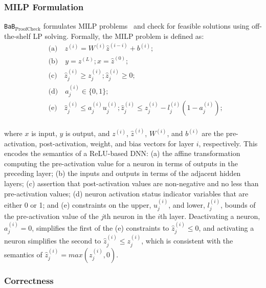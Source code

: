 \documentclass[oneside,11pt,dvipsnames]{book}
\numberwithin{equation}{section}
\theoremstyle{definition}
\theoremstyle{remark}
\newcommand{\proofcheck}{\texttt{BaB$_{\text{ProofCheck}}$}}
\begin{document}
\subsubsection{MILP Formulation}\label{sec:milp}

\proofcheck{} formulates MILP problems~\cite{tjeng2019evaluating} and check for feasible solutions using off-the-shelf LP solving. Formally, the MILP problem is defined as:
\begin{equation}
    \begin{aligned}
        &\mbox{(a)}\quad z^{(i)} = W^{(i)} \hat{z}^{(i-i)} + b^{(i)};\\
        &\mbox{(b)}\quad y = z^{(L)};  x = \hat{z}^{(0)}; \\
        &\mbox{(c)}\quad \hat{z}_j^{(i)} \ge {z}_j^{(i)}; \hat{z}_j^{(i)} \ge 0; \\
        &\mbox{(d)}\quad a_j^{(i)} \in \{ 0, 1\} ;\\
        &\mbox{(e)}\quad \hat{z}_j^{(i)} \le {a}_j^{(i)} {u}_j^{(i)}; \hat{z}_j^{(i)} \le {z}_j^{(i)} - {l}_j^{(i)}(1 - {a}_j^{(i)}); \\
    \end{aligned}
    \label{eq:mip}
\end{equation}

\noindent where $x$ is input, $y$ is output, and $z^{(i)}$, $\hat{z}^{(i)}$, $W^{(i)}$, and $b^{(i)}$ are the pre-activation, post-activation, weight, and bias vectors for layer $i$, respectively. 
This encodes the semantics of a ReLU-based DNN:  
(a) the affine transformation computing the pre-activation value for a neuron in terms of outputs in the preceding layer;
(b) the inputs and outputs in terms of the adjacent hidden layers;
(c) assertion that post-activation values are non-negative and no less than pre-activation values;
(d) neuron activation status indicator variables that are either 0 or 1; and
(e) constraints on the upper, $u_j^{(i)}$, and lower, $l_j^{(i)}$, bounds of the pre-activation value of the $j$th neuron in the $i$th layer.
Deactivating a neuron, $a_j^{(i)} = 0$, simplifies the first of the (e) constraints to $\hat{z}_j^{(i)} \le 0$, and activating a neuron simplifies the second to $\hat{z}_j^{(i)} \le z_j^{(i)}$, which is consistent with the semantics of $\hat{z}_j^{(i)} = max(z_j^{(i)},0)$.


\subsubsection{Correctness}\label{sec:checker-core-correctness}
\end{document}
